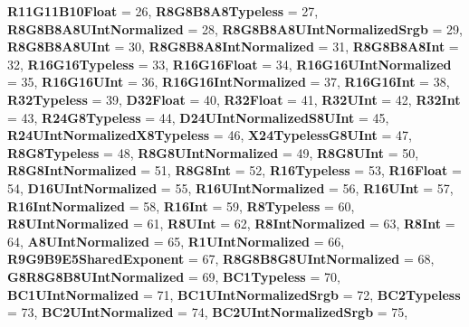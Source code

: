 \begin{DoxyCompactItemize}
{\bfseries R11\+G11\+B10\+Float} = 26, 
{\bfseries R8\+G8\+B8\+A8\+Typeless} = 27, 
\newline
{\bfseries R8\+G8\+B8\+A8\+U\+Int\+Normalized} = 28, 
{\bfseries R8\+G8\+B8\+A8\+U\+Int\+Normalized\+Srgb} = 29, 
{\bfseries R8\+G8\+B8\+A8\+U\+Int} = 30, 
{\bfseries R8\+G8\+B8\+A8\+Int\+Normalized} = 31, 
\newline
{\bfseries R8\+G8\+B8\+A8\+Int} = 32, 
{\bfseries R16\+G16\+Typeless} = 33, 
{\bfseries R16\+G16\+Float} = 34, 
{\bfseries R16\+G16\+U\+Int\+Normalized} = 35, 
\newline
{\bfseries R16\+G16\+U\+Int} = 36, 
{\bfseries R16\+G16\+Int\+Normalized} = 37, 
{\bfseries R16\+G16\+Int} = 38, 
{\bfseries R32\+Typeless} = 39, 
\newline
{\bfseries D32\+Float} = 40, 
{\bfseries R32\+Float} = 41, 
{\bfseries R32\+U\+Int} = 42, 
{\bfseries R32\+Int} = 43, 
\newline
{\bfseries R24\+G8\+Typeless} = 44, 
{\bfseries D24\+U\+Int\+Normalized\+S8\+U\+Int} = 45, 
{\bfseries R24\+U\+Int\+Normalized\+X8\+Typeless} = 46, 
{\bfseries X24\+Typeless\+G8\+U\+Int} = 47, 
\newline
{\bfseries R8\+G8\+Typeless} = 48, 
{\bfseries R8\+G8\+U\+Int\+Normalized} = 49, 
{\bfseries R8\+G8\+U\+Int} = 50, 
{\bfseries R8\+G8\+Int\+Normalized} = 51, 
\newline
{\bfseries R8\+G8\+Int} = 52, 
{\bfseries R16\+Typeless} = 53, 
{\bfseries R16\+Float} = 54, 
{\bfseries D16\+U\+Int\+Normalized} = 55, 
\newline
{\bfseries R16\+U\+Int\+Normalized} = 56, 
{\bfseries R16\+U\+Int} = 57, 
{\bfseries R16\+Int\+Normalized} = 58, 
{\bfseries R16\+Int} = 59, 
\newline
{\bfseries R8\+Typeless} = 60, 
{\bfseries R8\+U\+Int\+Normalized} = 61, 
{\bfseries R8\+U\+Int} = 62, 
{\bfseries R8\+Int\+Normalized} = 63, 
\newline
{\bfseries R8\+Int} = 64, 
{\bfseries A8\+U\+Int\+Normalized} = 65, 
{\bfseries R1\+U\+Int\+Normalized} = 66, 
{\bfseries R9\+G9\+B9\+E5\+Shared\+Exponent} = 67, 
\newline
{\bfseries R8\+G8\+B8\+G8\+U\+Int\+Normalized} = 68, 
{\bfseries G8\+R8\+G8\+B8\+U\+Int\+Normalized} = 69, 
{\bfseries B\+C1\+Typeless} = 70, 
{\bfseries B\+C1\+U\+Int\+Normalized} = 71, 
\newline
{\bfseries B\+C1\+U\+Int\+Normalized\+Srgb} = 72, 
{\bfseries B\+C2\+Typeless} = 73, 
{\bfseries B\+C2\+U\+Int\+Normalized} = 74, 
{\bfseries B\+C2\+U\+Int\+Normalized\+Srgb} = 75, 

\end{DoxyCompactItemize}
